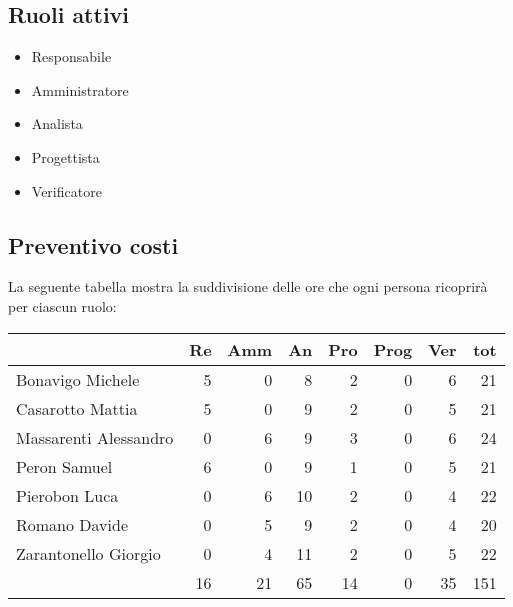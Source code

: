 \subsection{Ruoli attivi}
\begin{itemize}
    \item Responsabile 
    \item Amministratore 
    \item Analista 
    \item Progettista
    \item Verificatore
\end{itemize}

\subsection{Preventivo costi}

La seguente tabella mostra la suddivisione delle ore che ogni persona ricoprirà per ciascun ruolo:

\begin{table}[H]
    \begin{tabularx}{\linewidth}{X|rrrrrrr}
    \rowcolor{gray!30}& Re & Amm & An & Pro & Prog & Ver & tot \\
    \hline
    Bonavigo Michele                        & 5 & 0 & 8 & 2 & 0 & 6 & 21 \\
    \rowcolor{gray!10}Casarotto Mattia      & 5 & 0 & 9 & 2 & 0 & 5 & 21 \\
    Massarenti Alessandro                   & 0 & 6 & 9 & 3 & 0 & 6 & 24 \\
    \rowcolor{gray!10}Peron Samuel          & 6 & 0 & 9 & 1 & 0 & 5 & 21 \\
    Pierobon Luca                           & 0 & 6 & 10 & 2 & 0 & 4 & 22 \\
    \rowcolor{gray!10}Romano Davide         & 0 & 5 & 9 & 2 & 0 & 4 & 20 \\
    Zarantonello Giorgio                    & 0 & 4 & 11 & 2 & 0 & 5 & 22 \\
    \hline                                  & 16 & 21 & 65 & 14 & 0 & 35 & 151 \\ 
    \end{tabularx}
\end{table}

